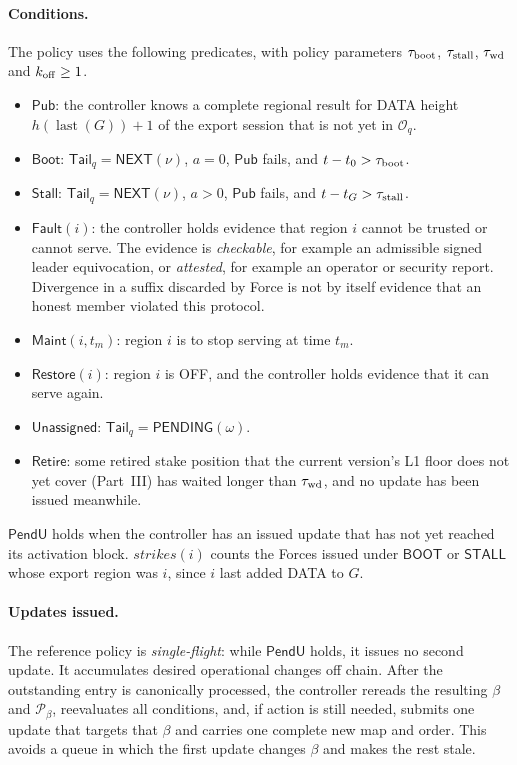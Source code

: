 \documentclass[11pt,a4paper]{article}
\newcommand{\tagg}[1]{\ensuremath{\mathsf{#1}}}
\newcommand{\defterm}[1]{\textcolor{rrBlue}{\textit{#1}}}
\newcounter{protocol}
\begin{document}
\paragraph{Conditions.}
The policy uses the following predicates, with policy parameters
$\tau_{\rm boot}$, $\tau_{\rm stall}$, $\tau_{\rm wd}$ and $k_{\rm off}\ge1$.
\begin{itemize}
\item $\tagg{Pub}$: the controller knows a complete regional result for
DATA height $h(\operatorname{last}(G))+1$ of the export session that is
not yet in $\mathcal O_q$.
\item $\tagg{Boot}$: $\mathsf{Tail}_q=\tagg{NEXT}(\nu)$, $a=0$, $\tagg{Pub}$ fails,
and $t-t_0>\tau_{\rm boot}$.
\item $\tagg{Stall}$: $\mathsf{Tail}_q=\tagg{NEXT}(\nu)$, $a>0$, $\tagg{Pub}$ fails,
and $t-t_G>\tau_{\rm stall}$.
\item $\tagg{Fault}(i)$: the controller holds evidence that region $i$
cannot be trusted or cannot serve. The evidence is \emph{checkable}, for
example an admissible signed leader equivocation, or
\emph{attested}, for example an operator or security report. Divergence
in a suffix discarded by Force is not by itself evidence that an honest
member violated this protocol.
\item $\tagg{Maint}(i,t_m)$: region $i$ is to stop serving at time $t_m$.
\item $\tagg{Restore}(i)$: region $i$ is OFF, and the controller holds
evidence that it can serve again.
\item $\tagg{Unassigned}$: $\mathsf{Tail}_q=\tagg{PENDING}(\omega)$.
\item $\tagg{Retire}$: some retired stake position that the current
version's L1 floor does not yet cover (Part~III) has waited longer than
$\tau_{\rm wd}$, and no update has been issued meanwhile.
\end{itemize}
$\tagg{PendU}$ holds when the controller has an issued update that has
not yet reached its activation block. $\mathit{strikes}(i)$ counts the
Forces issued under \tagg{BOOT} or \tagg{STALL} whose export region was
$i$, since $i$ last added DATA to $G$.

\paragraph{Updates issued.}
The reference policy is \defterm{single-flight}: while $\tagg{PendU}$
holds, it issues no second update. It accumulates desired operational
changes off chain. After the outstanding entry is canonically processed,
the controller rereads the resulting $\beta$ and $\mathcal P_\beta$, reevaluates
all conditions, and, if action is still needed, submits one update that
targets that $\beta$ and carries one complete new map and order. This avoids a
queue in which the first update changes $\beta$ and makes the rest stale.
\end{document}
